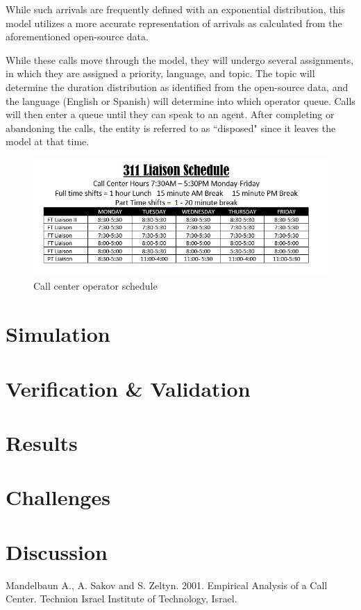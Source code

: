 \documentclass[12pt,twocolumn]{article}
\begin{document}
While such arrivals are frequently defined with an exponential distribution, this model utilizes a more accurate representation of arrivals as calculated from the aforementioned open-source data.  

\par

While these calls move through the model, they will undergo several assignments, in which they are assigned a priority, language, and topic.  The topic will determine the duration distribution as identified from the open-source data, and the language (English or Spanish) will determine into which operator queue.  Calls will then enter a queue until they can speak to an agent.  After completing or abandoning the calls, the entity is referred to as ``disposed" since it leaves the model at that time.

	\begin{figure}[h]
	\includegraphics[scale=.35]{schedule2.jpg}
	\caption{Call center operator schedule}
	\end{figure}

\section{Simulation}



\section{Verification \& Validation}



\section{Results}



\section{Challenges}



\section{Discussion}



\begin{thebibliography}{7}

Mandelbaun A., A. Sakov and S. Zeltyn. 2001. Empirical Analysis of a Call Center. Technion Israel Institute of Technology, Israel.

\end{thebibliography}
\end{document}
